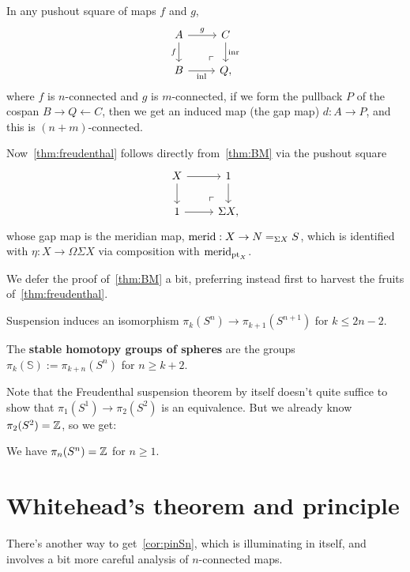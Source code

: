 \documentclass[10pt,oneside,leqno,openright]{memoir}
\begin{document}
\begin{theorem}
  \label{thm:BM}
  In any pushout square of maps $f$ and $g$,
  \[
    \begin{tikzcd}
      A \ar[r,"g"]\ar[d,"f"']\pocorner & C\ar[d,"{\inr}"] \\
      B \ar[r,"{\inl}"'] & Q,
    \end{tikzcd}
  \]
  where $f$ is $n$-connected and $g$ is $m$-connected, if we form the pullback $P$ of
  the cospan $B \to Q \leftarrow C$, then we get an induced
  map (the gap map) $d : A \to P$, and this is $(n+m)$-connected.
\end{theorem}

Now~\cref{thm:freudenthal} follows directly from~\cref{thm:BM} via the pushout square
\[
  \begin{tikzcd}
    X \ar[r]\ar[d]\pocorner & 1\ar[d] \\
    1 \ar[r] & \Sigma X,
  \end{tikzcd}
\]
whose gap map is the meridian map, $\operatorname{merid} : X \to N =_{\Sigma X} S$, which is
identified with $\eta : X \to \Omega\Sigma X$ via composition with $\operatorname{merid}_{\operatorname{pt}_X}$.

We defer the proof of~\cref{thm:BM} a bit, preferring instead first to harvest the fruits of~\cref{thm:freudenthal}.

\begin{corollary}
  Suspension induces an isomorphism $\pi_k(S^n) \to \pi_{k+1}(S^{n+1})$ for $k\le 2n-2$.
\end{corollary}
\begin{definition}
  The \textbf{stable homotopy groups of spheres} are the groups $\pi_k(\mathbb{S})
  := \pi_{k+n}(S^n)$ for $n \ge k+2$.
\end{definition}
Note that the Freudenthal suspension theorem by itself doesn't quite suffice to show that
$\pi_1(S^1) \to \pi_2(S^2)$ is an equivalence. But we already know $\pi_2(S^2)=\mathbb{Z}$, so we get:
\begin{corollary}\label{cor:pinSn}
  We have $\pi_n(S^n) = \mathbb{Z}$ for $n\ge 1$.
\end{corollary}

\section{Whitehead's theorem and principle}

There's another way to get~\cref{cor:pinSn}, which is illuminating in itself,
and involves a bit more careful analysis of $n$-connected maps.
\end{document}
